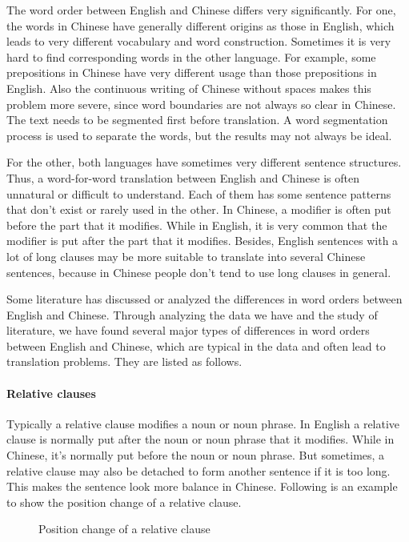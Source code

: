 The word order between English and Chinese differs very significantly. For one, the words in Chinese have generally different origins as those in English, which leads to very different vocabulary and word construction. Sometimes it is very hard to find corresponding words in the other language. For example, some prepositions in Chinese have very different usage than those prepositions in English. Also the continuous writing of Chinese without spaces makes this problem more severe, since word boundaries are not always so clear in Chinese. The text needs to be segmented first before translation. A word segmentation process is used to separate the words, but the results may not always be ideal.

For the other, both languages have sometimes very different sentence structures. Thus, a word-for-word translation between English and Chinese is often unnatural or difficult to understand. Each of them has some sentence patterns that don't exist or rarely used in the other. In Chinese, a modifier is often put before the part that it modifies. While in English, it is very common that the modifier is put after the part that it modifies. Besides, English sentences with a lot of long clauses may be more suitable to translate into several Chinese sentences, because in Chinese people don't tend to use long clauses in general. 

Some literature \citep{syntactic} has discussed or analyzed the differences in word orders between English and Chinese. Through analyzing the data we have and the study of literature, we have found several major types of differences in word orders between English and Chinese, which are typical in the data and often lead to translation problems. They are listed as follows.

\paragraph{Relative clauses}
Typically a relative clause modifies a noun or noun phrase. In English a relative clause is normally put after the noun or noun phrase that it modifies. While in Chinese, it's normally put before the noun or noun phrase. But sometimes, a relative clause may also be detached to form another sentence if it is too long. This makes the sentence look more balance in Chinese. Following is an example to show the position change of a relative clause.
\begin{figure}[H]
\centering

\caption{Position change of a relative clause}
\end{figure}

